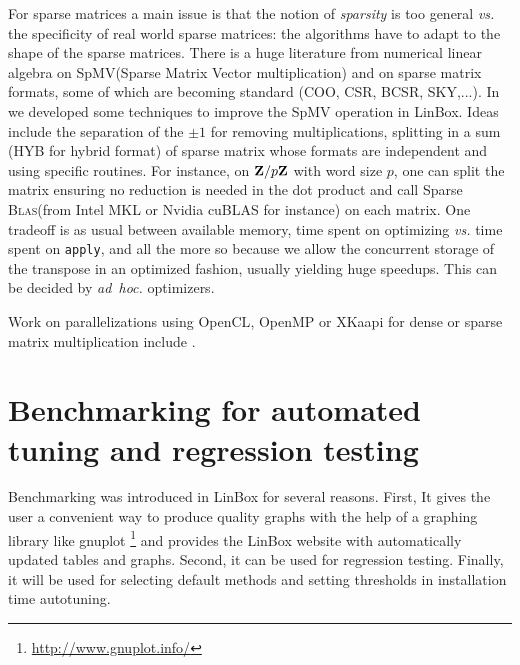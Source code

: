 \documentclass[a4paper]{article}
\def\textsf#1{{\biolinum #1}}
\def\scsf#1{{\scshape \biolinum #1}} %
\def\ldots{...}
\newcommand\Zb{\mathbf{Z}}
\newcommand\modring[1]{\ensuremath\Zb{/ #1\Zb}}
\newcommand\gnuplot{\textsf{gnuplot}\xspace}
\newcommand\linbox{\textsf{LinBox}\xspace}
\newcommand\apply{\texttt{apply}\xspace}
\newcommand\spmv{\textrm{SpMV}\xspace}
\newcommand{\vs}{\mbox{\emph{vs.}}\xspace}
\newcommand{\adhoc}{\mbox{\emph{ad hoc.}}\xspace}
\newcommand{\blas}{\scsf{Blas}\xspace}
\begin{document}
%
For sparse matrices a main issue is that the notion of \emph{sparsity}
is too general \vs the specificity of real world sparse matrices: the
algorithms have to adapt to the shape of the sparse matrices.
%
There is a huge literature from numerical linear algebra  on \spmv (Sparse
Matrix Vector multiplication) and on sparse matrix formats, some of which are
becoming standard (COO, CSR, BCSR, SKY,\ldots).  In \cite{Boyer:2010:spmv} we
developed some techniques to improve the \spmv operation in \linbox. Ideas
include the separation of the $\pm 1$ for removing multiplications, splitting
in a sum (HYB for hybrid format) of sparse matrix  whose formats are
independent and using specific routines. For instance, on $\modring{p}$ with
word size $p$, one can split the matrix ensuring no reduction is needed  in the
dot product and call Sparse \blas (from Intel \textsf{MKL} or Nvidia
\textsf{cuBLAS} for instance) on each matrix. One tradeoff is as usual between
available memory, time spent on optimizing \vs time spent on \apply, and all
the more so because we allow the concurrent storage of the transpose in an
optimized fashion, usually yielding huge speedups. This can be decided by
\adhoc optimizers.
%
\par
Work on parallelizations using \textsf{OpenCL}, \textsf{OpenMP} or
\textsf{XKaapi} for dense or sparse matrix multiplication include
\cite{Boyer:2010:spmv,WST12,DGPZ14}.
%
% 
\section{Benchmarking  for automated tuning and regression testing}\label{sec:bench}
%
Benchmarking was introduced in \linbox for several reasons. First, It
gives the user a convenient way to produce quality graphs with the
help
of a graphing library like \gnuplot
\footnote{\url{http://www.gnuplot.info/}}
%
and provides the \linbox website with automatically updated tables and graphs.
Second, it can be used for regression testing.  Finally, it will be used for
selecting default methods and setting thresholds in installation time autotuning. %
%
\par
%
%
%
\end{document}
